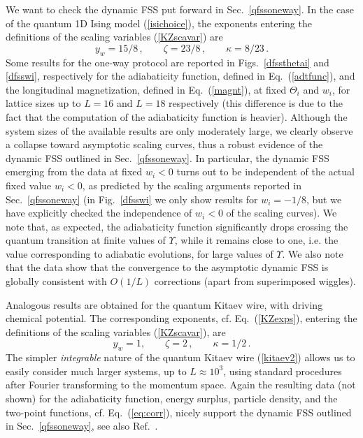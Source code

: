 We want to check the dynamic FSS put forward in Sec.~\ref{qfssoneway}.
In the case of the quantum 1D Ising model (\ref{isichoice}), the
exponents entering the definitions of the scaling variables
(\ref{KZscavar}) are 
\begin{equation}
y_w = 15/8\,,\qquad \zeta = 23/8\,,
\qquad \kappa = 8/23\,.
\label{qisiexps}
\end{equation}
Some results for the one-way protocol are reported in
Figs.~\ref{dfssthetai} and \ref{dfsswi}, respectively for the
adiabaticity function, defined in Eq.~(\ref{adtfunc}), and the
longitudinal magnetization, defined in Eq.~(\ref{magnt}), at fixed
$\Theta_i$ and $w_i$, for lattice sizes up to $L=16$ and $L=18$
respectively (this difference is due to the fact that the computation
of the adiabaticity function is heavier).  Although the system sizes
of the available results are only moderately large, we clearly observe
a collapse toward asymptotic scaling curves, thus a robust evidence of
the dynamic FSS outlined in Sec.~\ref{qfssoneway}.  In particular, the
dynamic FSS emerging from the data at fixed $w_i<0$ turns out to be
independent of the actual fixed value $w_i<0$, as predicted by the
scaling arguments reported in Sec.~\ref{qfssoneway} (in
Fig.~\ref{dfsswi} we only show results for $w_i=-1/8$, but we have
explicitly checked the independence of $w_i<0$ of the scaling
curves). We note that, as expected, the adiabaticity function
significantly drops crossing the quantum transition at finite values
of $\Upsilon$, while it remains close to one, i.e. the value
corresponding to adiabatic evolutions, for large values of $\Upsilon$.
We also  note that the data show that the convergence to the
asymptotic dynamic FSS is globally consistent with $O(1/L)$
corrections (apart from superimposed wiggles).


Analogous results are obtained for the quantum Kitaev wire, with
driving chemical potential.  The corresponding exponents,
cf. Eq.~(\ref{KZexps}), entering the definitions of the scaling
variables (\ref{KZscavar}), are
\begin{equation}
y_w = 1, \qquad \zeta = 2\,,\qquad \kappa =
1/2\,.
\label{kexps}
\end{equation}
The simpler {\em integrable} nature of the quantum Kitaev wire
(\ref{kitaev2}) allows us to easily consider much larger systems, up
to $L\approx 10^3$, using standard procedures after Fourier
transforming to the momentum space. Again the resulting data (not
shown) for the adiabaticity function, energy surplus, particle
density, and the two-point functions, cf. Eq.~(\ref{eq:corr}), nicely
support the dynamic FSS outlined in Sec.~\ref{qfssoneway}, see also
Ref.~\cite{RV-21}.




